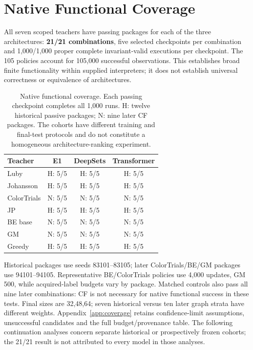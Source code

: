 \section{Native Functional Coverage}\label{sec:coverage}
All seven scoped teachers have passing packages for each of the three
architectures: \textbf{21/21 combinations}, five selected checkpoints per
combination and 1,000/1,000 proper complete invariant-valid executions per
checkpoint. The 105 policies account for 105,000 successful observations.
This establishes broad finite functionality within supplied interpreters;
it does not establish universal correctness or equivalence of architectures.

\begin{table}[htbp]\centering\small
\begin{tabular}{lccc}
\toprule Teacher & E1 & DeepSets & Transformer \\
\midrule
Luby & H: 5/5 & H: 5/5 & H: 5/5 \\
Johansson & H: 5/5 & H: 5/5 & H: 5/5 \\
ColorTrials & N: 5/5 & N: 5/5 & N: 5/5 \\
JP & H: 5/5 & H: 5/5 & H: 5/5 \\
BE base & N: 5/5 & N: 5/5 & N: 5/5 \\
GM & N: 5/5 & N: 5/5 & N: 5/5 \\
Greedy & H: 5/5 & H: 5/5 & H: 5/5 \\
\bottomrule
\end{tabular}
\caption{Native functional coverage. Each passing checkpoint completes all
1,000 runs. H: twelve historical passive packages; N: nine later CF packages.
The cohorts have different training and final-test protocols and do not
constitute a homogeneous architecture-ranking experiment.}
\label{tab:coverage}
\end{table}

Historical packages use seeds 83101--83105; later ColorTrials/BE/GM packages
use 94101--94105. Representative BE/ColorTrials policies use 4,000 updates,
GM 500, while acquired-label budgets vary by package. Matched controls also
pass all nine later combinations: CF is not necessary for native functional
success in these tests. Final sizes are 32,48,64; seven historical versus
ten later graph strata have different weights. Appendix~\ref{app:coverage}
retains confidence-limit assumptions, unsuccessful candidates and the full
budget/provenance table. The following continuation analyses concern
separate historical or prospectively frozen cohorts; the 21/21 result is
not attributed to every model in those analyses.

